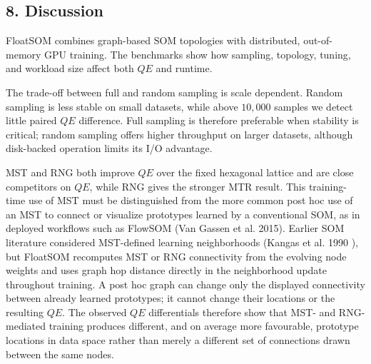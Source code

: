 \documentclass[
]{article}
\providecommand{\DIFadd}[1]{{\protect\color{blue} #1}} %
\providecommand{\DIFaddbegin}{} %
\providecommand{\DIFaddend}{} %
\begin{document}
\subsection{8. Discussion}\label{discussion}

 \DIFaddbegin \DIFadd{FloatSOM combines graph-based SOM topologies with distributed}\DIFaddend ,
out-of-memory  \DIFaddbegin \DIFadd{GPU training. The benchmarks show how sampling, topology,
}\DIFaddend tuning, and workload  \DIFaddbegin \DIFadd{size affect both \(QE\) and runtime}\DIFaddend .

 \DIFaddbegin \DIFadd{The }\DIFaddend trade-off  \DIFaddbegin \DIFadd{between full and random sampling is }\DIFaddend scale dependent.
 \DIFaddbegin \DIFadd{Random sampling is less stable on small datasets, while }\DIFaddend above
\(10{,}000\) samples \DIFaddbegin \DIFadd{we detect little }\DIFaddend paired \(QE\)  \DIFaddbegin \DIFadd{difference}\DIFaddend . Full
sampling is therefore  \DIFaddbegin \DIFadd{preferable }\DIFaddend when stability is  \DIFaddbegin \DIFadd{critical; random
sampling offers higher throughput on larger datasets, although
disk-backed operation limits its }\DIFaddend I/O \DIFaddbegin \DIFadd{advantage}\DIFaddend .

 MST and RNG  \DIFaddbegin \DIFadd{both improve \(QE\) over }\DIFaddend the fixed hexagonal  \DIFaddbegin \DIFadd{lattice and are
close competitors on \(QE\), while RNG gives the stronger MTR result.
This training-time use of MST must be distinguished from the more common
post hoc use of an MST to connect or visualize prototypes learned by a
conventional SOM, as in deployed workflows such as FlowSOM (Van Gassen
et al. 2015). Earlier SOM literature considered MST-defined learning
neighborhoods (}\DIFaddend Kangas et al. 1990\DIFaddbegin \DIFadd{), but FloatSOM recomputes MST or RNG
connectivity from the evolving node weights and uses graph hop distance
directly in the neighborhood update throughout training. A post hoc
graph can change only the displayed connectivity between already learned
prototypes; it cannot change their locations or the resulting \(QE\).
The observed \(QE\) differentials therefore show that MST- and
RNG-mediated training produces different, and on average more
favourable, prototype locations in data space rather than merely a
different set of connections drawn between the same nodes.
}
\end{document}
